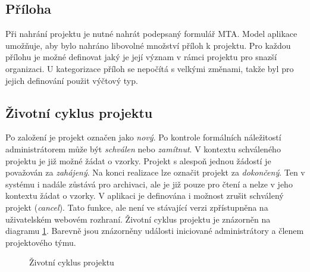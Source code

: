 \subsection{Příloha}
Při nahrání projektu je nutné nahrát podepsaný formulář MTA. Model aplikace umožňuje, aby bylo nahráno libovolné množství příloh k projektu. Pro každou přílohu je možné definovat jaký je její význam v rámci projektu pro snazší organizaci. U kategorizace příloh se nepočítá s velkými změnami, takže byl pro jejich definování použit výčtový typ.

\subsection{Životní cyklus projektu}
Po založení je projekt označen jako \textit{nový}. Po kontrole formálních náležitostí administrátorem může být \textit{schválen} nebo \textit{zamítnut}. V kontextu schváleného projektu je již možné žádat o vzorky. Projekt s alespoň jednou žádostí je považován za \textit{zahájený}. Na konci realizace lze označit projekt za \textit{dokončený}. Ten v systému i nadále zůstává pro archivaci, ale je již pouze pro čtení a nelze v jeho kontextu žádat o vzorky. 
V aplikaci je definována i možnost zrušit schválený projekt (\textit{cancel}). Tato funkce, ale není ve stávající verzi zpřístupněna na uživatelském webovém rozhraní. Životní cyklus projektu je znázorněn na diagramu \ref{fig:implementace:projekt:cyklus}. Barevně jsou znázorněny události iniciované {\color{palatinatepurple}administrátory} a {\color{cyan}členem projektového týmu}. 

\begin{figure}[hbtp]
\begin{center}
\caption{Životní cyklus projektu}
\label{fig:implementace:projekt:cyklus}
\end{center}
\end{figure}

